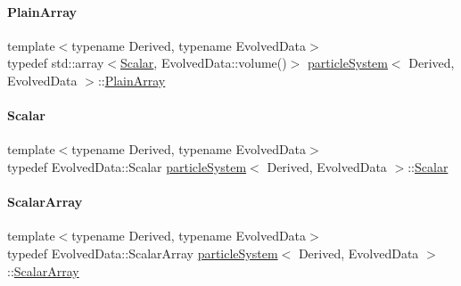 \mbox{\label{classparticle_system_ae5a7215810a9f2cad5508aca6b26a063}} 
\paragraph{\texorpdfstring{Plain\+Array}{PlainArray}}
{\footnotesize\ttfamily template$<$typename Derived, typename Evolved\+Data$>$ \\
typedef std\+::array$<$\mbox{\hyperlink{classparticle_system_a28e49da72c0ca5786d0611e6128a8994}{Scalar}}, Evolved\+Data\+::volume()$>$ \mbox{\hyperlink{classparticle_system}{particle\+System}}$<$ Derived, Evolved\+Data $>$\+::\mbox{\hyperlink{classparticle_system_ae5a7215810a9f2cad5508aca6b26a063}{Plain\+Array}}}

\mbox{\label{classparticle_system_a28e49da72c0ca5786d0611e6128a8994}} 
\paragraph{\texorpdfstring{Scalar}{Scalar}}
{\footnotesize\ttfamily template$<$typename Derived, typename Evolved\+Data$>$ \\
typedef Evolved\+Data\+::\+Scalar \mbox{\hyperlink{classparticle_system}{particle\+System}}$<$ Derived, Evolved\+Data $>$\+::\mbox{\hyperlink{classparticle_system_a28e49da72c0ca5786d0611e6128a8994}{Scalar}}}

\mbox{\label{classparticle_system_af7f328120ff85c8b34edeed4a68b746e}} 
\paragraph{\texorpdfstring{Scalar\+Array}{ScalarArray}}
{\footnotesize\ttfamily template$<$typename Derived, typename Evolved\+Data$>$ \\
typedef Evolved\+Data\+::\+Scalar\+Array \mbox{\hyperlink{classparticle_system}{particle\+System}}$<$ Derived, Evolved\+Data $>$\+::\mbox{\hyperlink{classparticle_system_af7f328120ff85c8b34edeed4a68b746e}{Scalar\+Array}}}


